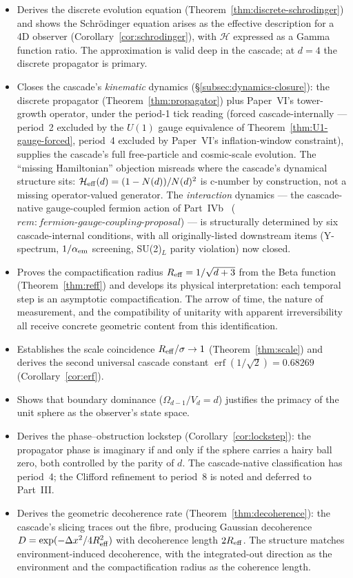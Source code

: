 \documentclass[12pt,a4paper]{article}
\begin{document}
\begin{itemize}
statistics (Renou \emph{et al.}~\cite{renou2021}).
\item Derives the discrete evolution equation (Theorem~\ref{thm:discrete-schrodinger}) and
shows the Schr\"{o}dinger equation arises as the effective description for a 4D observer
(Corollary~\ref{cor:schrodinger}), with $\mathcal{H}$ expressed as a Gamma function ratio.
The approximation is valid deep in the cascade; at $d=4$ the discrete propagator is primary.
\item Closes the cascade's \emph{kinematic} dynamics
(\S\ref{subsec:dynamics-closure}): the discrete propagator
(Theorem~\ref{thm:propagator}) plus Paper~VI's tower-growth
operator, under the period-1 tick reading
(forced cascade-internally --- period~2 excluded by the $U(1)$
gauge equivalence of Theorem~\ref{thm:U1-gauge-forced}, period~4
excluded by Paper~VI's inflation-window constraint), supplies the
cascade's full free-particle and cosmic-scale evolution. The
``missing Hamiltonian'' objection misreads where the cascade's
dynamical structure sits: $\mathcal{H}_{\rm eff}(d) = (1-N(d))/N(d)^2$
is c-number by construction, not a missing operator-valued
generator. The \emph{interaction} dynamics --- the cascade-native
gauge-coupled fermion action of Part~IVb~\cite{part4b}
($\mathit{rem{:}fermion\text{-}gauge\text{-}coupling\text{-}proposal}$) ---
is structurally determined by six cascade-internal conditions, with
all originally-listed downstream items (Y-spectrum, $1/\alpha_{\rm em}$
screening, SU(2)$_L$ parity violation) now closed.
\item Proves the compactification radius $R_{\rm eff}=1/\sqrt{d+3}$ from the Beta function
(Theorem~\ref{thm:reff}) and develops its physical interpretation: each temporal step is an
asymptotic compactification. The arrow of time, the nature of measurement, and the
compatibility of unitarity with apparent irreversibility all receive concrete geometric
content from this identification.
\item Establishes the scale coincidence $R_{\rm eff}/\sigma\to 1$ (Theorem~\ref{thm:scale})
and derives the second universal cascade constant $\operatorname{erf}(1/\sqrt{2}) = 0.68269$
(Corollary~\ref{cor:erf}).
\item Shows that boundary dominance ($\Omega_{d-1}/V_d=d$) justifies the primacy of the
unit sphere as the observer's state space.
\item Derives the phase--obstruction lockstep (Corollary~\ref{cor:lockstep}): the
propagator phase is imaginary if and only if the sphere carries a hairy ball zero, both
controlled by the parity of $d$. The cascade-native classification has period~4; the
Clifford refinement to period~8 is noted and deferred to Part~III.
\item Derives the geometric decoherence rate (Theorem~\ref{thm:decoherence}): the
cascade's slicing traces out the fibre, producing Gaussian decoherence
$D = \exp(-\Delta x^2/4R_{\rm eff}^2)$ with decoherence length $2R_{\rm eff}$. The
structure matches environment-induced decoherence, with the integrated-out direction as the
environment and the compactification radius as the coherence length.
\end{itemize}
\end{document}
